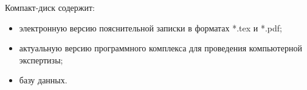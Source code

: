 \newpage
\renewcommand{\refname}{Список использованных источников}


Компакт-диск содержит: 
\begin{itemize}
\item электронную версию пояснительной записки в форматах *.tex и *.pdf;
\item актуальную версию программного комплекса для проведения компьютерной экспертизы;
\item базу данных.
\end{itemize}


